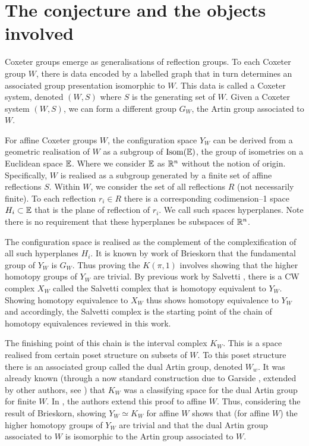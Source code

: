 \documentclass[class=guthesis, crop=false]{standalone}
\begin{document}
\section{The conjecture and the objects involved}
Coxeter groups emerge as generalisations of reflection groups. To each Coxeter group $W$, there is data encoded by a labelled graph that in turn determines an associated group presentation isomorphic to $W$. This data is called a Coxeter system, denoted $(W,S)$ where $S$ is the generating set of $W$. Given a Coxeter system $(W,S)$, we can form a different group $G_W$, the Artin group associated to $W$.

For affine Coxeter groups $W$, the configuration space $Y_W$ can be derived from a geometric realisation of $W$ as a subgroup of $\operatorname{Isom}(\mathbb{E})$, the group of isometries on a Euclidean space $\mathbb{E}$. Where we consider $\mathbb{E}$ as $\mathbb{R}^n$ without the notion of origin. Specifically, $W$ is realised as a subgroup generated by a finite set of affine reflections $S$. Within $W$, we consider the set of all reflections $R$ (not necessarily finite). To each reflection $r_i \in R$ there is a corresponding codimension--1 space $H_i \subset \mathbb{E}$ that is the plane of reflection of $r_i$. We call such spaces hyperplanes. Note there is no requirement that these hyperplanes be subspaces of $\mathbb{R}^n$.

The configuration space is realised as the complement of the complexification of all such hyperplanes $H_i$. It is known by work of Brieskorn \cite{brieskorn_fundamentalgruppe_1971} that the fundamental group of $Y_W$ is $G_W$. Thus proving the $K(\pi,1)$ involves showing that the higher homotopy groups of $Y_W$ are trivial. By previous work by Salvetti \cite{salvetti_topology_1987,salvetti_homotopy_1994}, there is a CW complex $X_W$ called the Salvetti complex that is homotopy equivalent to $Y_W$. Showing homotopy equivalence to $X_W$ thus shows homotopy equivalence to $Y_W$ and accordingly, the Salvetti complex is the starting point of the chain of homotopy equivalences reviewed in this work.

The finishing point of this chain is the interval complex $K_W$. This is a space realised from certain poset structure on subsets of $W$. To this poset structure there is an associated group called the dual Artin group, denoted $W_w$. It was already known (through a now standard construction due to Garside \cite{garside_braid_1969}, extended by other authors, see \cite{charney_etal_bestvina_2002}) that $K_W$ was a classifying space for the dual Artin group for finite $W$. In \cite{paolini_salvetti_kpi1_2021}, the authors extend this proof to affine $W$. Thus, considering the result of Brieskorn, showing $Y_W \simeq K_W$ for affine $W$ shows that (for affine $W$) the higher homotopy groups of $Y_W$ are trivial and that the dual Artin group associated to $W$ is isomorphic to the Artin group associated to $W$.
\end{document}
